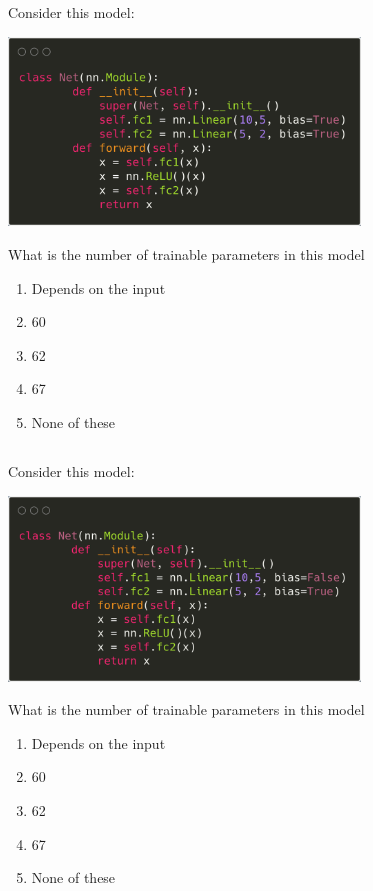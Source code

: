 
\begin{frame}
\section{}
Consider this model:

\includegraphics[width=0.7\textwidth]{images/quiz_4_4_2_1.png}

What is the number of trainable parameters in this model


\begin{enumerate}[label=(\Alph*)]
\item Depends on the input
\item 60
\item 62
\item 67    %
\item None of these   %
\end{enumerate}

\end{frame}


\begin{frame}
\section{}
Consider this model:

\includegraphics[width=0.7\textwidth]{images/quiz_4_4_2_2.png}

What is the number of trainable parameters in this model


\begin{enumerate}[label=(\Alph*)]
\item Depends on the input
\item 60
\item 62    %
\item 67
\item None of these   %
\end{enumerate}

\end{frame}


